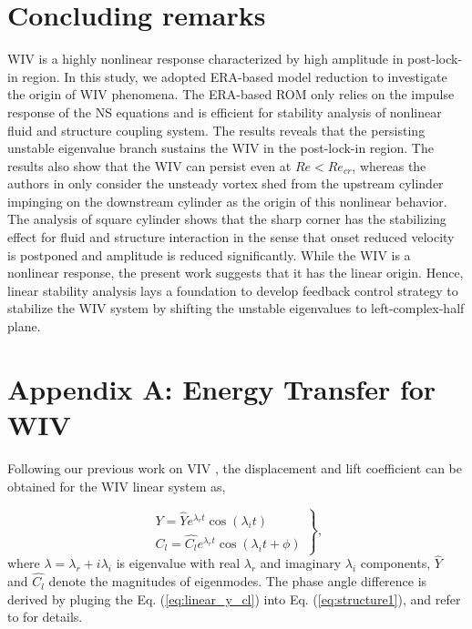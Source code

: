 \section{Concluding remarks}\label{sec:conclusion}
WIV is a highly nonlinear response characterized by high amplitude in post-lock-in region. 
In this study, we adopted ERA-based model reduction to investigate the origin of WIV phenomena. 
The ERA-based ROM only relies on the impulse response of the NS equations and is efficient 
for stability analysis of nonlinear fluid and structure coupling system. 
The results reveals that the persisting unstable eigenvalue branch sustains the WIV in the post-lock-in 
region. The results also show that the WIV can persist even at $Re<Re_{cr}$, whereas the authors in \cite{Mysa2016,MYSA201727} only consider the unsteady vortex shed from the upstream cylinder impinging on the downstream cylinder as the origin of 
this nonlinear behavior. The analysis of square cylinder shows that the sharp corner has the stabilizing effect for 
fluid and structure interaction in the sense that onset reduced velocity is postponed and amplitude is reduced significantly. 
While the WIV is a nonlinear response, the present work suggests that it has the linear origin. Hence, 
linear stability analysis lays a foundation to develop feedback control strategy to stabilize the WIV system 
by shifting the unstable eigenvalues to left-complex-half plane. 


\section*{Appendix A: Energy Transfer for WIV}\label{app:A} 

Following our previous work on VIV \cite{yao_jfm_1}, 
the displacement and lift coefficient can be obtained  for the WIV linear system as, 
 
\begin{equation}
\left. \begin{array}{ll}
\displaystyle Y=\hat{Y} e^{\lambda_r t}\cos(\lambda_i t)  \\[8pt]
\displaystyle C_l=\hat{C_l} e^{\lambda_r t}\cos(\lambda_i t + \phi)
\end{array}\right\},
\label{eq:linear_y_cl}
\end{equation}
where $\lambda=\lambda_r+i\lambda_i$ is eigenvalue with real $\lambda_r$ 
and imaginary $\lambda_i$ components, $\hat{Y}$ and $\hat{C_l}$ 
denote the magnitudes of eigenmodes. The phase angle difference is derived 
by pluging the Eq. (\ref{eq:linear_y_cl}) into Eq. (\ref{eq:structure1}), and refer
to \cite{yao_jfm_1} for details. 

